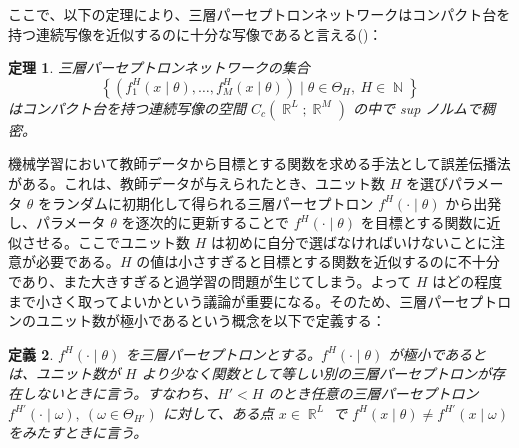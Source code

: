 \documentclass{jsarticle}
\DeclareMathOperator{\R}{\mathbb{R}}
\DeclareMathOperator{\N}{\mathbb{N}}
\newtheorem{thm}{定理}[section]
\newtheorem{defn}[thm]{定義}
\begin{document}
ここで、以下の定理により、三層パーセプトロンネットワークはコンパクト台を持つ連続写像を近似するのに十分な写像であると言える(\cite{cybenko})：
\begin{thm}
  三層パーセプトロンネットワークの集合
  \[
    \left\{ \left(f_1^H(x\mid \theta),\ldots, f_M^H(x \mid \theta)\right)\mid \theta \in \Theta_H,\ H \in \N\right\}
  \]
  はコンパクト台を持つ連続写像の空間 $C_c(\R^L;\R^M)$ の中で sup ノルムで稠密。
\end{thm}
機械学習において教師データから目標とする関数を求める手法として誤差伝播法がある。これは、教師データが与えられたとき、ユニット数 $H$ を選びパラメータ $\theta$ をランダムに初期化して得られる三層パーセプトロン $f^H(\cdot \mid \theta)$ から出発し、パラメータ $\theta$ を逐次的に更新することで $f^H(\cdot \mid \theta)$ を目標とする関数に近似させる。ここでユニット数 $H$ は初めに自分で選ばなければいけないことに注意が必要である。$H$ の値は小さすぎると目標とする関数を近似するのに不十分であり、また大きすぎると過学習の問題が生じてしまう。よって $H$ はどの程度まで小さく取ってよいかという議論が重要になる。そのため、三層パーセプトロンのユニット数が極小であるという概念を以下で定義する：
\begin{defn}
  $f^H(\cdot \mid \theta)$ を三層パーセプトロンとする。$f^H(\cdot \mid \theta)$ が極小であるとは、ユニット数が $H$ より少なく関数として等しい別の三層パーセプトロンが存在しないときに言う。すなわち、$H' < H$ のとき任意の三層パーセプトロン $f^{H'}(\cdot \mid \omega), \ (\omega \in \Theta_{H'})$ に対して、ある点 $x \in \R^L$ で $f^H(x\mid \theta) \neq f^{H'}(x \mid \omega)$ をみたすときに言う。
\end{defn}
\end{document}
